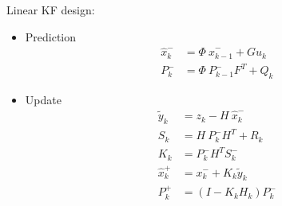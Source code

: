 Linear \ac{KF} design:
\begin{itemize}
\item Prediction
\begin{align}
\hat x_k^- &= \Phi\ \hat x_{k-1}^- + G u_k \\
P_k^- &= \Phi\ P_{k-1}^- F^T + Q_{k}
\end{align}

\item Update
\begin{align}
\tilde y_k &= z_k - H\ \hat x_k^-\\
S_k &= H\ P_k^-H^T + R_k\\
K_k &= P_k^-H^TS_k^-\\
\hat x_k^+ &= x_k^- + K_k \tilde y_k\\
P_k^+ &= (I - K_k H_k) P_k^-
\end{align}
\end{itemize}